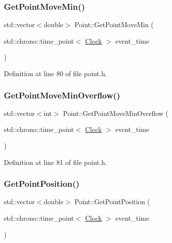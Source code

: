 \subsubsection{\texorpdfstring{Get\+Point\+Move\+Min()}{GetPointMoveMin()}}
{\footnotesize\ttfamily std\+::vector$<$double$>$ Point\+::\+Get\+Point\+Move\+Min (\begin{DoxyParamCaption}\item[{std\+::chrono\+::time\+\_\+point$<$ \hyperlink{universe_8h_a0ef8d951d1ca5ab3cfaf7ab4c7a6fd80}{Clock} $>$}]{event\+\_\+time }\end{DoxyParamCaption})\hspace{0.3cm}{\ttfamily [inline]}}



Definition at line 80 of file point.\+h.

\mbox{\label{class_point_a3c88bb9f80535e98fb0f479b69f75c64}} 
\subsubsection{\texorpdfstring{Get\+Point\+Move\+Min\+Overflow()}{GetPointMoveMinOverflow()}}
{\footnotesize\ttfamily std\+::vector$<$int$>$ Point\+::\+Get\+Point\+Move\+Min\+Overflow (\begin{DoxyParamCaption}\item[{std\+::chrono\+::time\+\_\+point$<$ \hyperlink{universe_8h_a0ef8d951d1ca5ab3cfaf7ab4c7a6fd80}{Clock} $>$}]{event\+\_\+time }\end{DoxyParamCaption})\hspace{0.3cm}{\ttfamily [inline]}}



Definition at line 81 of file point.\+h.

\mbox{\label{class_point_a521d229550d7f38851f9ffb1933046a6}} 
\subsubsection{\texorpdfstring{Get\+Point\+Position()}{GetPointPosition()}}
{\footnotesize\ttfamily std\+::vector$<$double$>$ Point\+::\+Get\+Point\+Position (\begin{DoxyParamCaption}\item[{std\+::chrono\+::time\+\_\+point$<$ \hyperlink{universe_8h_a0ef8d951d1ca5ab3cfaf7ab4c7a6fd80}{Clock} $>$}]{event\+\_\+time }\end{DoxyParamCaption})\hspace{0.3cm}{\ttfamily [inline]}}



